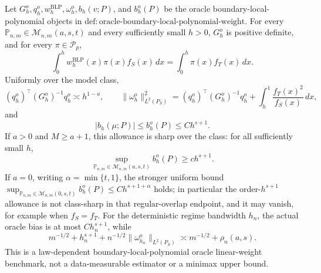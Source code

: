 Let \(G_h^o,q_h^o,w_h^{\mathrm{BLP}},\omega_h^o,b_h(v;P)\), and \(b_h^o(P)\) be the oracle boundary-local-polynomial objects in \(\mathrm{def:oracle\text{-}boundary\text{-}local\text{-}polynomial\text{-}weight}\). For every \(\mathbb P_{n,m}\in\mathcal M_{n,m}(a,s,t)\) and every sufficiently small \(h>0\), \(G_h^o\) is positive definite, and for every \(\pi\in\mathcal P_p\),
\[
\int_0^h w_h^{\mathrm{BLP}}(x)\pi(x)f_S(x)\,dx
=\int_0^h\pi(x)f_T(x)\,dx.
\]
Uniformly over the model class,
\[
(q_h^o)^\top(G_h^o)^{-1}q_h^o\asymp h^{1-a},
\qquad
\|\omega_h^o\|_{L^2(P_S)}^2
=(q_h^o)^\top(G_h^o)^{-1}q_h^o
+\int_h^1\frac{f_T(x)^2}{f_S(x)}\,dx,
\]
and
\[
|b_h(\mu;P)|\le b_h^o(P)\le C h^{s+1}.
\]
If \(a>0\) and \(M\ge a+1\), this allowance is sharp over the class: for all sufficiently small \(h\),
\[
\sup_{\mathbb P_{n,m}\in\mathcal M_{n,m}(a,s,t)}b_h^o(P)\ge c h^{s+1}.
\]
If \(a=0\), writing \(\alpha=\min\{t,1\}\), the stronger uniform bound \(\sup_{\mathbb P_{n,m}\in\mathcal M_{n,m}(0,s,t)}b_h^o(P)\le C h^{s+1+\alpha}\) holds; in particular the order-\(h^{s+1}\) allowance is not class-sharp in that regular-overlap endpoint, and it may vanish, for example when \(f_S=f_T\). For the deterministic regime bandwidth \(h_n\), the actual oracle bias is at most \(C h_n^{s+1}\), while
\[
m^{-1/2}+h_n^{s+1}+n^{-1/2}\|\omega_{h_n}^o\|_{L^2(P_S)}
\asymp m^{-1/2}+\rho_n(a,s).
\]
This is a law-dependent boundary-local-polynomial oracle linear-weight benchmark, not a data-measurable estimator or a minimax upper bound.